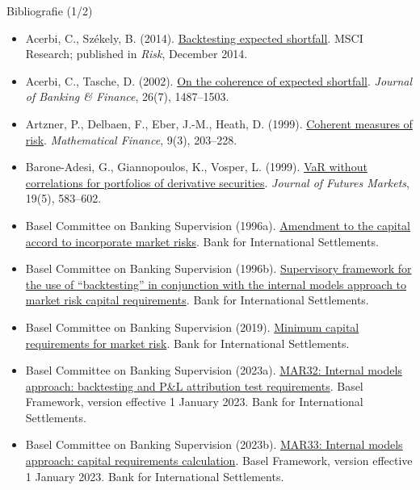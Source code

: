 \begin{frame}{Bibliografie (1/2)}
\itemsize{\tiny}
\begin{itemize}
    \item Acerbi, C., Székely, B. (2014). \href{https://www.msci.com/documents/10199/22aa9922-f874-4060-b77a-0f0e267a489b}{Backtesting expected shortfall}. MSCI Research; published in \textit{Risk}, December 2014.
    \item Acerbi, C., Tasche, D. (2002). \href{https://doi.org/10.1016/S0378-4266(02)00283-2}{On the coherence of expected shortfall}. \textit{Journal of Banking \& Finance}, 26(7), 1487--1503.
    \item Artzner, P., Delbaen, F., Eber, J.-M., Heath, D. (1999). \href{https://doi.org/10.1111/1467-9965.00068}{Coherent measures of risk}. \textit{Mathematical Finance}, 9(3), 203--228.
    \item Barone-Adesi, G., Giannopoulos, K., Vosper, L. (1999). \href{https://doi.org/10.1002/(SICI)1096-9934(199908)19:5<583::AID-FUT5>3.0.CO;2-S}{VaR without correlations for portfolios of derivative securities}. \textit{Journal of Futures Markets}, 19(5), 583--602.
    \item Basel Committee on Banking Supervision (1996a). \href{https://www.bis.org/publ/bcbs24.htm}{Amendment to the capital accord to incorporate market risks}. Bank for International Settlements.
    \item Basel Committee on Banking Supervision (1996b). \href{https://www.bis.org/publ/bcbs22.htm}{Supervisory framework for the use of ``backtesting'' in conjunction with the internal models approach to market risk capital requirements}. Bank for International Settlements.
    \item Basel Committee on Banking Supervision (2019). \href{https://www.bis.org/bcbs/publ/d457.htm}{Minimum capital requirements for market risk}. Bank for International Settlements.
    \item Basel Committee on Banking Supervision (2023a). \href{https://www.bis.org/basel_framework/chapter/MAR/32.htm}{MAR32: Internal models approach: backtesting and P\&L attribution test requirements}. Basel Framework, version effective 1 January 2023. Bank for International Settlements.
    \item Basel Committee on Banking Supervision (2023b). \href{https://www.bis.org/basel_framework/chapter/MAR/33.htm}{MAR33: Internal models approach: capital requirements calculation}. Basel Framework, version effective 1 January 2023. Bank for International Settlements.

\end{itemize}
\end{frame}
